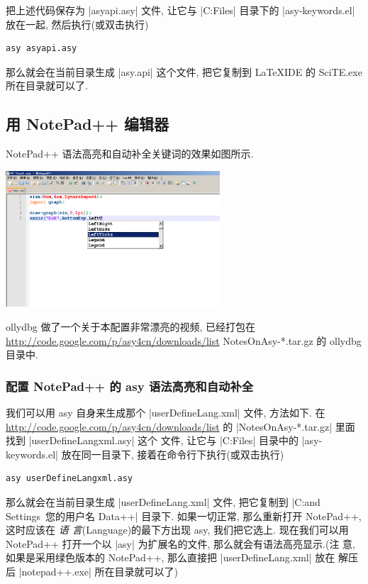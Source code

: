 \documentclass[nofonts,CJKnormalspaces]{ctexbook}[2009/05/20]
\begin{document}


把上述代码保存为 |asyapi.asy| 文件, 让它与 |C:\Program Files\Asymptote|
目录下的 |asy-keywords.el| 放在一起, 然后执行(或双击执行)
\begin{verbatim}
asy asyapi.asy
\end{verbatim}
那么就会在当前目录生成 |asy.api| 这个文件, 把它复制到 LaTeXIDE 的
SciTE.exe 所在目录就可以了.

\subsection{用 NotePad++ 编辑器}
NotePad++ 语法高亮和自动补全关键词的效果如图所示.
\begin{center}
  \includegraphics[width=0.6\textwidth]{NotePad++0.png}
\end{center}
ollydbg 做了一个关于本配置非常漂亮的视频, 已经打包在
\url{http://code.google.com/p/asy4cn/downloads/list}
NotesOnAsy-*.tar.gz 的 ollydbg 目录中.

\subsubsection{配置 NotePad++ 的 asy 语法高亮和自动补全}
我们可以用 asy 自身来生成那个 |userDefineLang.xml| 文件, 方法如下.
在 \url{http://code.google.com/p/asy4cn/downloads/list} 的
|NotesOnAsy-*.tar.gz| 里面找到 |userDefineLangxml.asy| 这个
文件, 让它与 |C:\Program Files\Asymptote| 目录中的 |asy-keywords.el|
放在同一目录下, 接着在命令行下执行(或双击执行)
\begin{verbatim}
asy userDefineLangxml.asy
\end{verbatim}
那么就会在当前目录生成 |userDefineLang.xml| 文件, 把它复制到
|C:\Documents and Settings\ 您的用户名 \Application Data\Notepad++|
目录下. 如果一切正常, 那么重新打开 NotePad++, 这时应该在 \emph{语
  言}(Language)的最下方出现 asy, 我们把它选上. 现在我们可以用
NotePad++ 打开一个以 |asy| 为扩展名的文件, 那么就会有语法高亮显示.(注
意, 如果是采用绿色版本的 NotePad++, 那么直接把 |userDefineLang.xml| 放在
解压后 |notepad++.exe| 所在目录就可以了)
\end{document}
